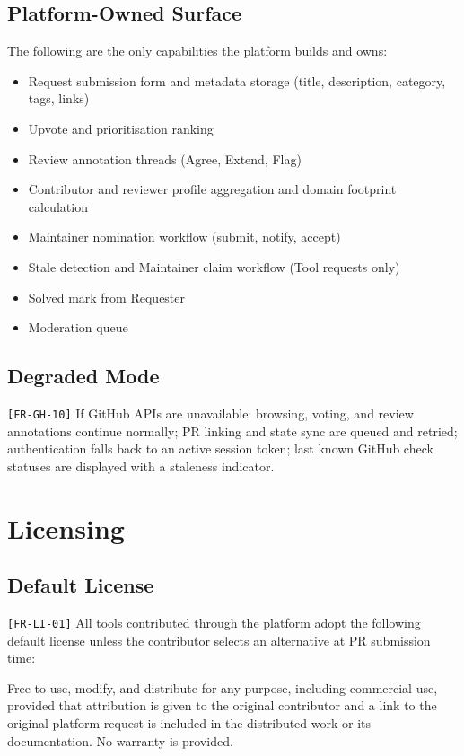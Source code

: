 \documentclass[12pt,a4paper]{article}
\begin{document}
\subsection{Platform-Owned Surface}
The following are the only capabilities the platform builds and owns:
\begin{itemize}
  \item Request submission form and metadata storage (title, description, category, tags, links)
  \item Upvote and prioritisation ranking
  \item Review annotation threads (Agree, Extend, Flag)
  \item Contributor and reviewer profile aggregation and domain footprint calculation
  \item Maintainer nomination workflow (submit, notify, accept)
  \item Stale detection and Maintainer claim workflow (Tool requests only)
  \item Solved mark from Requester
  \item Moderation queue
\end{itemize}

\subsection{Degraded Mode}
\texttt{[FR-GH-10]} If GitHub APIs are unavailable: browsing, voting, and review annotations continue normally; PR linking and state sync are queued and retried; authentication falls back to an active session token; last known GitHub check statuses are displayed with a staleness indicator.

\section{Licensing}

\subsection{Default License}
\texttt{[FR-LI-01]} All tools contributed through the platform adopt the following default license unless the contributor selects an alternative at PR submission time:

\begin{infobox}
Free to use, modify, and distribute for any purpose, including commercial use, provided that attribution is given to the original contributor and a link to the original platform request is included in the distributed work or its documentation. No warranty is provided.
\end{infobox}
\end{document}
